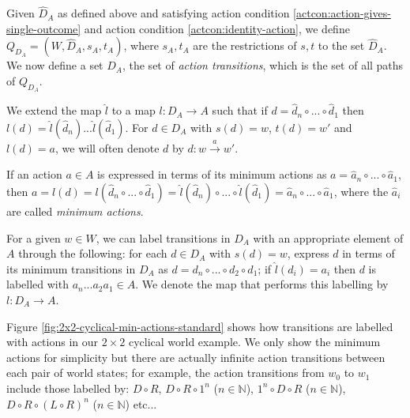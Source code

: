 Given $\hat{D}_{A}$ as defined above and satisfying  action condition \ref{actcon:action-gives-single-outcome} and  action condition \ref{actcon:identity-action}, we define $Q_{D_{A}} = (W, \hat{D}_{A}, s_{A}, t_{A})$, where $s_{A}, t_{A}$ are the restrictions of $s,t$ to the set $\hat{D}_{A}$.
We now define a set $D_{A}$, the set of \textit{action transitions}, which is the set of all paths of $Q_{D_{A}}$.

We extend the map $\hat{l}$ to a map $l: D_{A} \to A$ such that if $d = \hat{d}_{n} \circ ... \circ \hat{d}_{1}$ then $l(d) = \hat{l}(\hat{d}_{n}) ... \hat{l}(\hat{d}_{1})$.
For $d \in D_{A}$ with $s(d) = w$, $t(d) = w'$ and $l(d) = a$, we will often denote $d$ by $d: w \xrightarrow{a} w'$.

If an action $a \in A$ is expressed in terms of its minimum actions as $a = \hat{a}_{n} \circ ... \circ \hat{a}_{1}$, then $a = l(d) = l(\hat{d}_{n} \circ ... \circ \hat{d}_{1}) = \hat{l}(\hat{d}_{n}) \circ ... \circ \hat{l}(\hat{d}_{1}) = \hat{a}_{n} \circ ... \circ \hat{a}_{1}$, where the $\hat{a}_{i}$ are called \textit{minimum actions}.


\begin{remark}
    For a given $w \in W$, we can label transitions in $D_{A}$ with an appropriate element of $A$ through the following: for each $d \in D_{A}$ with $s(d)=w$, express $d$ in terms of its minimum transitions in $D_{A}$ as $d = d_{n} \circ ... \circ d_{2} \circ d_{1}$; if $\hat{l}(d_{i}) = a_{i}$ then $d$ is labelled with $a_{n}...a_{2}a_{1} \in A$.
    We denote the map that performs this labelling by $l: D_{A} \to A$.
\end{remark}

Figure \ref{fig:2x2-cyclical-min-actions-standard} shows how transitions are labelled with actions in our $2 \times 2$ cyclical world example.
We only show the minimum actions for simplicity but there are actually infinite action transitions between each pair of world states; for example, the action transitions from $w_{0}$ to $w_{1}$ include those labelled by: $D \circ R$, $D \circ R \circ 1^{n}$ ($n \in \mathbb{N}$), $1^{n} \circ D \circ R$ ($n \in \mathbb{N}$), $D \circ R \circ (L \circ R)^{n}$ ($n \in \mathbb{N}$) etc...

